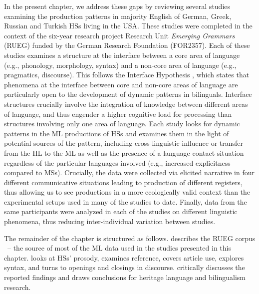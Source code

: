 \documentclass[output=paper,colorlinks,citecolor=brown]{langscibook}
\begin{document}
In the present chapter, we address these gaps by reviewing several studies examining the production patterns in majority English of German, Greek, Russian and Turkish HSs living in the USA. These studies were completed in the context of the six-year research project Research Unit \textit{ Emerging Grammars} (RUEG) funded by the German Research Foundation (FOR2357). Each of these studies examines a structure at the interface between a core area of language (e.g., phonology, morphology, syntax) and a non-core area of language (e.g., pragmatics, discourse). This follows the Interface Hypothesis \parencite{Sorace_2011, tsimpli2014}, which states that phenomena at the interface between core and non-core areas of language are particularly open to the development of dynamic patterns in bilinguals. Interface structures crucially involve the integration of knowledge between different areas of language, and thus engender a higher cognitive load for processing than structures involving only one area of language. Each study looks for dynamic patterns in the ML productions of HSs and examines them in the light of potential sources of the pattern, including cross-linguistic influence or transfer from the HL to the ML as well as the presence of a language contact situation regardless of the particular languages involved (e.g., increased explicitness compared to MSs). Crucially, the data were collected via elicited narrative in four different communicative situations leading to production of different registers, thus allowing us to see productions in a more ecologically valid context than the experimental setups used in many of the studies to date. Finally, data from the same participants were analyzed in each of the studies on different linguistic phenomena, thus reducing inter-individual variation between studies. 

The remainder of the chapter is structured as follows.  describes the RUEG corpus \parencite{RUEGcorpus2024}~-- the source of most of the ML data used in the studies presented in this chapter.  looks at HSs’ prosody,  examines reference,  covers article use,  explores syntax, and  turns to openings and closings in discourse.  critically discusses the reported findings and draws conclusions for heritage language and bilingualism research.
\end{document}
